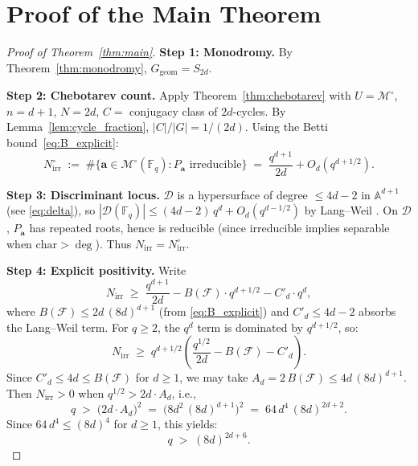 \documentclass[11pt, a4paper]{article}
\theoremstyle{definition}
\theoremstyle{remark}
\newcommand{\Fq}{\mathbb{F}_q}
\newcommand{\Affine}{\mathbb{A}}
\begin{document}
\section{Proof of the Main Theorem}\label{sec:proof}

\begin{proof}[Proof of Theorem~\ref{thm:main}]
\textbf{Step 1: Monodromy.}
By Theorem~\ref{thm:monodromy}, $G_{\mathrm{geom}} = S_{2d}$.

\textbf{Step 2: Chebotarev count.}
Apply Theorem~\ref{thm:chebotarev} with $U = \mathcal{M}^\circ$,
$n = d + 1$, $N = 2d$, $C = $ conjugacy class of $2d$-cycles.
By Lemma~\ref{lem:cycle_fraction}, $|C|/|G| = 1/(2d)$.
Using the Betti bound~\eqref{eq:B_explicit}:
\begin{equation}\label{eq:count_intermediate}
    N_{\mathrm{irr}}^{\circ}
    \;:=\;
    \#\{\mathbf{a} \in \mathcal{M}^\circ(\Fq) :
    P_\mathbf{a} \text{ irreducible}\}
    \;=\;
    \frac{q^{d+1}}{2d}
    + O_d(q^{d+1/2}).
\end{equation}

\textbf{Step 3: Discriminant locus.}
$\mathcal{D}$ is a hypersurface of degree $\le 4d - 2$
in $\Affine^{d+1}$ (see \eqref{eq:delta}),
so $|\mathcal{D}(\Fq)| \le (4d-2)\,q^d + O_d(q^{d-1/2})$
by Lang--Weil \cite{LW1954}.
On $\mathcal{D}$, $P_\mathbf{a}$ has repeated roots, hence is
reducible (since irreducible implies separable when
$\mathrm{char} > \deg$).
Thus $N_{\mathrm{irr}} = N_{\mathrm{irr}}^\circ$.

\textbf{Step 4: Explicit positivity.}
Write
\begin{equation}\label{eq:positivity}
    N_{\mathrm{irr}}
    \;\ge\;
    \frac{q^{d+1}}{2d}
    - B(\mathcal{F}) \cdot q^{d+1/2}
    - C'_d \cdot q^d,
\end{equation}
where $B(\mathcal{F}) \le 2d\,(8d)^{d+1}$
(from \eqref{eq:B_explicit}) and
$C'_d \le 4d - 2$ absorbs the Lang--Weil term.
For $q \ge 2$, the $q^d$ term is dominated by $q^{d+1/2}$, so:
\[
    N_{\mathrm{irr}}
    \;\ge\;
    q^{d+1/2}\!\left(
    \frac{q^{1/2}}{2d} - B(\mathcal{F}) - C'_d
    \right).
\]
Since $C'_d \le 4d \le B(\mathcal{F})$ for $d \ge 1$,
we may take $A_d = 2\,B(\mathcal{F}) \le 4d\,(8d)^{d+1}$.
Then $N_{\mathrm{irr}} > 0$ when
$q^{1/2} > 2d \cdot A_d$, i.e.,
\[
    q \;>\; \bigl(2d \cdot A_d\bigr)^2
    \;=\; \bigl(8d^2\,(8d)^{d+1}\bigr)^2
    \;=\; 64\,d^4\,(8d)^{2d+2}.
\]
Since $64\,d^4 \le (8d)^4$ for $d \ge 1$, this yields:
\begin{equation}\label{eq:threshold}
    q \;>\; (8d)^{2d+6}.
\end{equation}
\end{proof}
\end{document}
